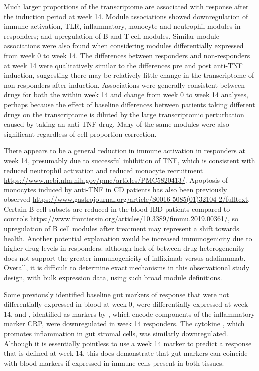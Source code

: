 \begin{outline}
Much larger proportions of the transcriptome are associated with response after the induction period at week 14.
Module associations
showed downregulation of immune activation, \gls{TLR}, inflammatory, monocyte and neutrophil modules in responders;
and upregulation of B and T cell modules.
Similar module associations were also found when considering modules differentially expressed from week 0 to week 14.
The differences between responders and non-responders at week 14 
were qualitatively similar to the differences pre and post anti-\gls{TNF} induction,
suggesting there may be relatively little change in the transcriptome of non-responders after induction.
Associations were generally consistent between drugs for both the within week 14 and change from week 0 to week 14 analyses,
perhaps because the effect of baseline differences between patients taking different drugs on the transcriptome is diluted
by the large transcriptomic perturbation caused by taking an anti-\gls{TNF} drug.
Many of the same modules were also significant regardless of cell proportion correction.

There appears to be a general reduction in immune activation in responders at week 14,
presumably due to successful inhibition of \gls{TNF},
which is consistent with reduced neutrophil activation and reduced monocyte recruitment \url{https://www.ncbi.nlm.nih.gov/pmc/articles/PMC5820413/}.
Apoptosis of monocytes induced by anti-\gls{TNF} in \gls{CD} patients has also been previously observed \url{https://www.gastrojournal.org/article/S0016-5085(01)32104-2/fulltext}.
Certain B cell subsets are reduced in the blood \gls{IBD} patients compared to controls \url{https://www.frontiersin.org/articles/10.3389/fimmu.2019.00361/}, 
so upregulation of B cell modules after treatment may represent a shift towards health.
Another potential explanation would be increased immunogenicity due to higher drug levels in responders\autocite{kennedy2019PredictorsAntiTNFTreatment}.
although lack of between-drug heterogenenity does not support the greater immunogenicity of infliximab versus adalimumab.
Overall, it is difficult to determine exact mechanisms in this observational study design, with bulk expression data, using such broad module definitions.

Some previously identified baseline gut markers of response that were not differentially expressed in blood at week 0, were differentially expressed at week 14.
 and , identified as markers by \textcite{arijs2010PredictiveValueEpithelial}, which encode components of the inflammatory marker \gls{CRP}, were downregulated in week 14 responders.
The cytokine , which promotes inflammation in gut stromal cells\autocite{west2017OncostatinDrivesIntestinal}, was similarly downregulated.
Although it is essentially pointless to use a week 14 marker to predict a response that is defined at week 14,
this does demonstrate that gut markers can coincide with blood markers if expressed in immune cells present in both tissues.


\end{outline}
